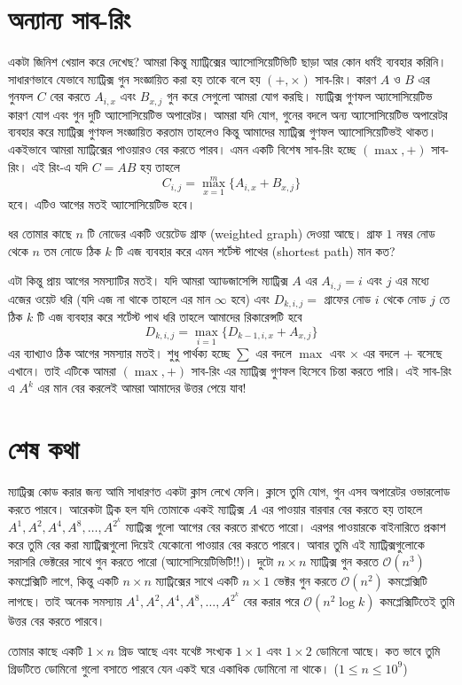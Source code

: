 \section{অন্যান্য সাব-রিং}
একটা জিনিশ খেয়াল করে দেখেছ? আমরা কিন্তু ম্যাট্রিক্সের অ্যাসোসিয়েটিভিটি ছাড়া আর কোন ধর্মই ব্যবহার করিনি। সাধারণভাবে যেভাবে ম্যাট্রিক্স গুন সংজ্ঞায়িত করা হয় তাকে বলে হয় $(+, \times)$ সাব-রিং। কারণ  $A$ ও $B$ এর গুনফল $C$ বের করতে $A_{i, x}$ এবং $B_{x, j}$ গুন করে সেগুলো আমরা যোগ করছি। ম্যাট্রিক্স গুণফল  অ্যাসোসিয়েটিভ কারণ যোগ এবং গুন দুটি অ্যাসোসিয়েটিভ অপারেটর। আমরা যদি যোগ, গুনের বদলে অন্য অ্যাসোসিয়েটিভ অপারেটর ব্যবহার করে ম্যাট্রিক্স গুণফল সংজ্ঞায়িত করতাম তাহলেও কিন্তু আমাদের ম্যাট্রিক্স গুণফল অ্যাসোসিয়েটিভই থাকত। একইভাবে আমরা ম্যাট্রিক্সের পাওয়ারও বের করতে পারব। এমন একটি বিশেষ সাব-রিং হচ্ছে $(\max, +)$ সাব-রিং। এই রিং-এ যদি $C = AB$ হয় তাহলে
$$C_{i, j} = \max_{x = 1}^m \lbrace A_{i, x} + B_{x, j} \rbrace$$
হবে। এটিও আগের মতই অ্যাসোসিয়েটিভ হবে।
\begin{problem}
ধর তোমার কাছে $n$ টি নোডের একটি ওয়েটেড গ্রাফ (weighted graph) দেওয়া আছে। গ্রাফ $1$ নম্বর নোড থেকে $n$ তম নোডে ঠিক $k$ টি এজ ব্যবহার করে এমন শর্টেস্ট পাথের (shortest path) মান কত?
\end{problem}
\begin{solution}
এটা কিন্তু প্রায় আগের সমস্যাটির মতই। যদি আমরা অ্যাডজাসেন্সি ম্যাট্রিক্স $A$ এর $A_{i, j} = i$ এবং $j$ এর মধ্যে এজের ওয়েট ধরি (যদি এজ না থাকে তাহলে এর মান $\infty$ হবে) এবং  $D_{k, i, j} = $ গ্রাফের নোড $i$ থেকে নোড $j$ তে ঠিক $k$ টি এজ ব্যবহার করে শর্টেস্ট পাথ ধরি তাহলে আমাদের রিকারেন্সটি হবে
$$ D_{k, i, j} = \max_{i = 1} \lbrace D_{k - 1, i, x} + A_{x, j} \rbrace$$
এর ব্যাখ্যাও ঠিক আগের সমস্যার মতই। শুধু পার্থক্য হচ্ছে $\sum$ এর বদলে $\max$ এবং $\times$ এর বদলে $+$ বসেছে এখানে। তাই এটিকে আমরা $(\max, +)$ সাব-রিং এর ম্যাট্রিক্স গুণফল হিসেবে চিন্তা করতে পারি। এই সাব-রিং এ $A^{k}$ এর মান বের করলেই আমরা আমাদের উত্তর পেয়ে যাব!
\end{solution}

\section{শেষ কথা}
ম্যাট্রিক্স কোড করার জন্য আমি সাধারণত একটা ক্লাস লেখে ফেলি। ক্লাসে তুমি যোগ, গুন এসব অপারেটর ওভারলোড করতে পারবে। আরেকটা ট্রিক হল যদি তোমাকে একই ম্যাট্রিক্স $A$ এর পাওয়ার বারবার বের করতে হয় তাহলে $A^1, A^2, A^4, A^8, \dots, A^{2^k}$ ম্যাট্রিক্স গুলো আগের বের করতে রাখতে পারো। এরপর পাওয়ারকে বাইনারিতে প্রকাশ করে তুমি বের করা ম্যাট্রিক্সগুলো দিয়েই যেকোনো পাওয়ার বের করতে পারবে। আবার তুমি এই ম্যাট্রিক্সগুলোকে সরাসরি ভেক্টরের সাথে গুন করতে পারো (অ্যাসোসিয়েটিভিটি!!)।  দুটো $n \times n$ ম্যাট্রিক্স গুন করতে $\mathcal{O}(n^3)$ কমপ্লেক্সিটি লাগে, কিন্তু একটি $n \times n$ ম্যাট্রিক্সের সাথে একটি $n \times 1$ ভেক্টর গুন করতে $\mathcal{O}(n^2)$ কমপ্লেক্সিটি লাগছে। তাই অনেক সমস্যায় $A^1, A^2, A^4, A^8, \dots, A^{2^k}$ বের করার পরে $\mathcal{O}(n^2 \log{k})$ কমপ্লেক্সিটিতেই তুমি উত্তর বের করতে পারবে।

\begin{diybox}
তোমার কাছে একটি $1 \times n$ গ্রিড আছে এবং যথেষ্ট সংখ্যক $1 \times 1$ এবং $1 \times 2$ ডোমিনো আছে। কত ভাবে তুমি গ্রিডটিতে ডোমিনো গুলো বসাতে পারবে যেন একই ঘরে একাধিক ডোমিনো না থাকে। ($1 \leq n \leq 10^{9}$)
\end{diybox}
